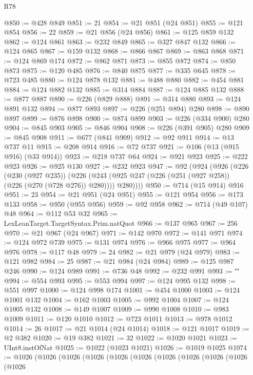 \begin{lexlean}{R78}
\begin{coremodule}
@850 := @428 @849
@851 := 21
@854 := @21 @851 (@24 @851)
@855 := @121 @854
@856 := 22
@859 := @21 @856 (@24 @856)
@861 := @125 @859 @132
@862 := @124 @861
@863 := @232 @849
@865 := @327 @847 @132
@866 := @124 @865
@867 := @159 @132
@868 := @866 @867
@869 := @863 @868
@871 := @124 @869 @174
@872 := @862 @871
@873 := @855 @872
@874 := @850 @873
@875 := @120 @485
@876 := @840 @875
@877 := @335 @645
@878 := @723 @485
@880 := @124 @878 @132
@881 := @488 @880
@882 := @454 @881
@884 := @124 @882 @132
@885 := @314 @884
@887 := @124 @885 @132
@888 := @877 @887
@890 := @226 (@829 @888)
@891 := @314 @880
@893 := @124 @891 @132
@894 := @877 @893
@897 := @226 (@251 @894) @280
@898 := @890 @897
@899 := @876 @898
@900 := @874 @899
@903 := @226 (@334 @900) @280
@904 := @845 @903
@905 := @846 @904
@908 := @226 (@391 @905) @280
@909 := @845 @908
@911 := @677 (@841 @909)
@912 := @92 @911
@914 := @13 @737 @11
@915 := @208 @914
@916 := @72 @737
@921 := @106 (@13 (@915 @916) (@33 @914))
@923 := @218 @737 @64
@924 := @921 @923
@925 := @222 @923
@926 := @925 @130
@927 := @232 @923
@947 := @92
    (@924
      (@926
        (@226
          (@230 (@927 @235))
          (@226 (@243 (@925 @247 (@226 (@251 (@927 @258)) (@226 (@270 (@728 @276)) @280)))) @280))))
@950 := @714 (@15 @914) @916
@951 := 23
@954 := @21 @951 (@24 @951)
@955 := @121 @954
@956 := @173 @133
@958 := @950 (@955 @956)
@959 := @92 @958
@962 := @714 (@49 @107) @48
@964 := @112 @53 @32
@965 := LexLeanTarget.TargetSyntax.Prim.natQuot
@966 := @137 @965
@967 := 256
@970 := @21 @967 (@24 @967)
@971 := @142 @970
@972 := @141 @971
@974 := @124 @972 @739
@975 := @131 @974
@976 := @966 @975
@977 := @964 @976
@978 := @117 @48
@979 := 24
@982 := @21 @979 (@24 @979)
@983 := @121 @982
@984 := 25
@987 := @21 @984 (@24 @984)
@989 := @125 @987 @246
@990 := @124 @989
@991 := @736 @48
@992 := @232 @991
@993 := "\n"
@994 := @554 @993
@995 := @553 @994
@997 := @124 @995 @132
@998 := @551 @997
@1000 := @124 @998 @174
@1001 := @454 @1000
@1003 := @124 @1001 @132
@1004 := @162 @1003
@1005 := @992 @1004
@1007 := @124 @1005 @132
@1008 := @149 @1007
@1009 := @990 @1008
@1010 := @983 @1009
@1011 := @120 @1010
@1012 := @723 @1011
@1013 := @978 @1012
@1014 := 26
@1017 := @21 @1014 (@24 @1014)
@1018 := @121 @1017
@1019 := @2 @382
@1020 := @19 @382
@1021 := 32
@1022 := @1020 @1021
@1023 := UInt8.instOfNat
@1025 := @1022 (@1023 @1021)
@1026 := @1019 @1025
@1074 := @1026
    (@1026
      (@1026
        (@1026
          (@1026
            (@1026
              (@1026
                (@1026
                  (@1026
                    (@1026
                      (@1026

\end{coremodule}
\end{lexlean}

